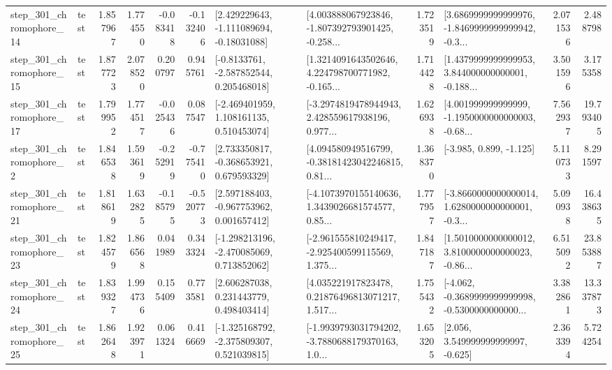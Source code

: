\begin{tabular}{llrrrrllrlrr}
  step\_301\_chromophore\_14 &      test &      1.857967 &    1.774550 &     -0.083418 & -0.132406 &    [2.429229643, -1.111089694, -0.18031088] &  [4.003888067923846, -1.807392793901425, -0.258... &       1.723519 &  [3.6869999999999976, -1.8469999999999942, -0.3... &            2.071536 &          2.488798 \\
  step\_301\_chromophore\_15 &      test &      1.877723 &    2.078520 &      0.200797 &  0.945761 &     [-0.8133761, -2.587852544, 0.205468018] &  [1.3214091643502646, 4.224798700771982, -0.165... &       1.714428 &  [1.4379999999999953, 3.844000000000001, -0.188... &            3.501596 &          3.175358 \\
  step\_301\_chromophore\_17 &      test &      1.799952 &    1.774517 &     -0.025436 &  0.087547 &    [-2.469401959, 1.108161135, 0.510453074] &  [-3.2974819478944943, 2.428559617938196, 0.977... &       1.626938 &  [4.001999999999999, -1.1950000000000003, -0.68... &            7.562937 &         19.793405 \\
   step\_301\_chromophore\_2 &      test &      1.846538 &    1.593619 &     -0.252919 & -0.775410 &    [2.733350817, -0.368653921, 0.679593329] &  [4.094580949516799, -0.38181423042246815, 0.81... &       1.368370 &                            [-3.985, 0.899, -1.125] &            5.110733 &          8.291597 \\
  step\_301\_chromophore\_21 &      test &      1.818619 &    1.632825 &     -0.185795 & -0.520773 &    [2.597188403, -0.967753962, 0.001657412] &  [-4.1073970155140636, 1.3439026681574577, 0.85... &       1.777957 &  [-3.8660000000000014, 1.6280000000000001, -0.3... &            5.090938 &         16.438635 \\
  step\_301\_chromophore\_23 &      test &      1.824579 &    1.866568 &      0.041989 &  0.343324 &   [-1.298213196, -2.470085069, 0.713852062] &  [-2.961555810249417, -2.925400599115569, 1.375... &       1.847187 &  [1.5010000000000012, 3.8100000000000023, -0.86... &            6.515092 &         23.853887 \\
  step\_301\_chromophore\_24 &      test &      1.839327 &    1.994736 &      0.155409 &  0.773581 &     [2.606287038, 0.231443779, 0.498403414] &  [4.035221917823478, 0.21876496813071217, 1.517... &       1.755432 &  [-4.062, -0.3689999999999998, -0.5300000000000... &            3.382861 &         13.337873 \\
  step\_301\_chromophore\_25 &      test &      1.862648 &    1.923971 &      0.061324 &  0.416669 &   [-1.325168792, -2.375809307, 0.521039815] &  [-1.9939793031794202, -3.7880688179370163, 1.0... &       1.653205 &                 [2.056, 3.549999999999997, -0.625] &            2.363394 &          5.724254 \\

\end{tabular}
